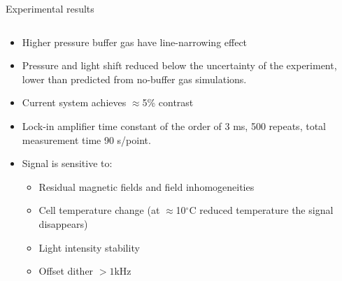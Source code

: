 \begin{block}{Experimental results}
\begin{columns}
\begin{column}{.49\textwidth}
\begin{center}
      \end{center}
    \end{column}
    \end{columns}
    \begin{itemize}
    \item Higher pressure buffer gas have line-narrowing effect
    \item Pressure and light shift reduced below the uncertainty of the experiment, lower than predicted from no-buffer gas simulations.
    \item Current system achieves $\approx$5\% contrast
    \item Lock-in amplifier time constant of the order of 3 ms, 500 repeats, total measurement time 90 s/point.
    \item Signal is sensitive to:
      \begin{itemize}
        \item Residual magnetic fields and field inhomogeneities
        \item Cell temperature change (at $\approx$10$^\circ$C reduced temperature the signal disappears)
        \item Light intensity stability
        \item Offset dither $>1$kHz
        \end{itemize}
    \end{itemize}
\end{block}
